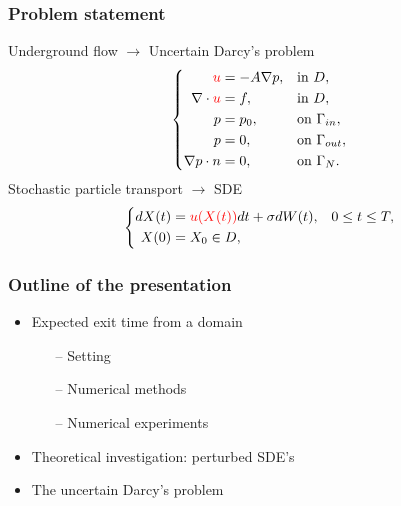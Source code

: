 \begin{frame}
\frametitle{Problem statement}
Underground flow $\rightarrow$ Uncertain Darcy's problem
\begin{equation*}
	\left \{
  	\begin{aligned}
		\color{red}{u} &= -A \nabla p, && \text{in } D, \\
		\nabla\cdot \color{red}{u} &= f, && \text{in } D, \\
		p &= p_0, && \text{on } \Gamma_{in},\\
		p &= 0, && \text{on } \Gamma_{out}, \\
		\nabla p \cdot n &= 0, && \text{on } \Gamma_N.
	\end{aligned} \right.
\end{equation*}
Stochastic particle transport $\rightarrow$ SDE
\begin{equation*}
	\left \{
	\begin{aligned}
		dX(t) &= \color{red}{u} (X(t)) \color{black} dt + \sigma dW(t), && 0 \leq t \leq T, \\
		X(0) &= X_0 \in D, \\
	\end{aligned} \right.
\end{equation*}
\end{frame}

\begin{frame}
\frametitle{Outline of the presentation}
\begin{itemize}
	\item Expected exit time from a domain
	\begin{itemize}
		\item[--] Setting
		\item[--] Numerical methods
		\item[--] Numerical experiments
	\end{itemize}
	\item Theoretical investigation: perturbed SDE's 
	\item The uncertain Darcy's problem 
\end{itemize}
\end{frame}
